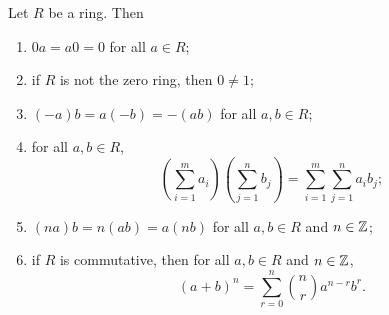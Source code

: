 \begin{theorem}
    Let \(R\) be a ring. Then
    \begin{enumerate}[label={\normalfont(\alph*)}]
        \item \(0a = a0 = 0\) for all \(a \in R\);
        \item if \(R\) is not the zero ring, then \(0 \neq 1\);
        \item \((-a)b = a(-b) = -(ab)\) for all \(a, b \in R\);
        \item for all \(a, b \in R\),
        \[
            \left(\sum_{i=1}^{m} a_i\right)\left(\sum_{j=1}^{n} b_j\right) = \sum_{i=1}^{m} \sum_{j=1}^{n} a_i b_j;
        \]
        \item \((na)b = n(ab) = a(nb)\) for all \(a, b \in R\) and \(n \in \mathbb{Z}\);
        \item if \(R\) is commutative, then for all \(a, b \in R\) and \(n \in
        \mathbb{Z}\),
            \[
                (a + b)^n = \sum_{r = 0}^{n} \binom{n}{r} a^{n-r} b^r.
            \]
    \end{enumerate}
\end{theorem}

